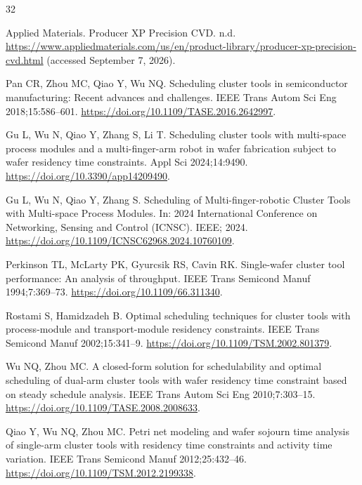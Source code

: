 \documentclass[final,5p,times,twocolumn]{elsarticle}
\begin{document}
\small
\setlength{\bibsep}{0pt}
\begin{thebibliography}{32}

Applied Materials. Producer XP Precision CVD.
n.d.
\url{https://www.appliedmaterials.com/us/en/product-library/producer-xp-precision-cvd.html} (accessed September 7, 2026).

Pan CR, Zhou MC, Qiao Y, Wu NQ. Scheduling cluster tools in semiconductor manufacturing: Recent advances and challenges.
IEEE Trans Autom Sci Eng 2018;15:586--601.
\url{https://doi.org/10.1109/TASE.2016.2642997}.

Gu L, Wu N, Qiao Y, Zhang S, Li T. Scheduling cluster tools with multi-space process modules and a multi-finger-arm robot in wafer fabrication subject to wafer residency time constraints.
Appl Sci 2024;14:9490.
\url{https://doi.org/10.3390/app14209490}.

Gu L, Wu N, Qiao Y, Zhang S. Scheduling of {Multi-finger-robotic Cluster Tools} with {Multi-space Process Modules}.
In: 2024 International Conference on Networking, Sensing and Control ({ICNSC}). IEEE; 2024.
\url{https://doi.org/10.1109/ICNSC62968.2024.10760109}.

Perkinson TL, McLarty PK, Gyurcsik RS, Cavin RK. Single-wafer cluster tool performance: An analysis of throughput.
IEEE Trans Semicond Manuf 1994;7:369--73.
\url{https://doi.org/10.1109/66.311340}.

Rostami S, Hamidzadeh B. Optimal scheduling techniques for cluster tools with process-module and transport-module residency constraints.
IEEE Trans Semicond Manuf 2002;15:341--9.
\url{https://doi.org/10.1109/TSM.2002.801379}.

Wu NQ, Zhou MC. A closed-form solution for schedulability and optimal scheduling of dual-arm cluster tools with wafer residency time constraint based on steady schedule analysis.
IEEE Trans Autom Sci Eng 2010;7:303--15.
\url{https://doi.org/10.1109/TASE.2008.2008633}.

Qiao Y, Wu NQ, Zhou MC. Petri net modeling and wafer sojourn time analysis of single-arm cluster tools with residency time constraints and activity time variation.
IEEE Trans Semicond Manuf 2012;25:432--46.
\url{https://doi.org/10.1109/TSM.2012.2199338}.


\end{thebibliography}
\end{document}
